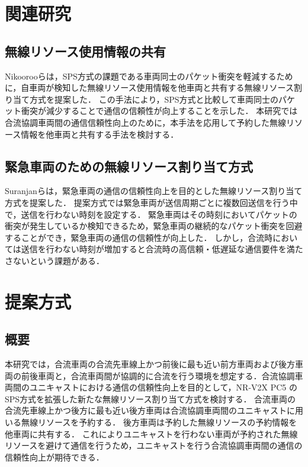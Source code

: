 \documentclass[a4paper,10pt,twocolumn,uplatex]{jsarticle}
\begin{document}
\section{関連研究}
\subsection{無線リソース使用情報の共有}
Nikoorooらは，SPS方式の課題である車両同士のパケット衝突を軽減するために，自車両が検知した無線リソース使用情報を他車両と共有する無線リソース割り当て方式を提案した．
この手法により，SPS方式と比較して車両同士のパケット衝突が減少することで通信の信頼性が向上することを示した\cite{NR_RMAP}．
本研究では合流協調車両間の通信信頼性向上のために，本手法を応用して予約した無線リソース情報を他車両と共有する手法を検討する．

\subsection{緊急車両のための無線リソース割り当て方式}
Suranjanらは，緊急車両の通信の信頼性向上を目的とした無線リソース割り当て方式を提案した\cite{Emerge}．
提案方式では緊急車両が送信周期ごとに複数回送信を行う中で，送信を行わない時刻を設定する．
緊急車両はその時刻においてパケットの衝突が発生しているか検知できるため，緊急車両の継続的なパケット衝突を回避することができ，緊急車両の通信の信頼性が向上した．
しかし，合流時においては送信を行わない時刻が増加すると合流時の高信頼・低遅延な通信要件を満たさないという課題がある．


\section{提案方式}
\subsection{概要}
本研究では，合流車両の合流先車線上かつ前後に最も近い前方車両および後方車両の前後車両と，合流車両間が協調的に合流を行う環境を想定する．合流協調車両間のユニキャストにおける通信の信頼性向上を目的として，NR-V2X PC5 のSPS方式を拡張した新たな無線リソース割り当て方式を検討する．
合流車両の合流先車線上かつ後方に最も近い後方車両は合流協調車両間のユニキャストに用いる無線リソースを予約する．
後方車両は予約した無線リソースの予約情報を他車両に共有する．
これによりユニキャストを行わない車両が予約された無線リソースを避けて通信を行うため，ユニキャストを行う合流協調車両間の通信の信頼性向上が期待できる．
\end{document}

